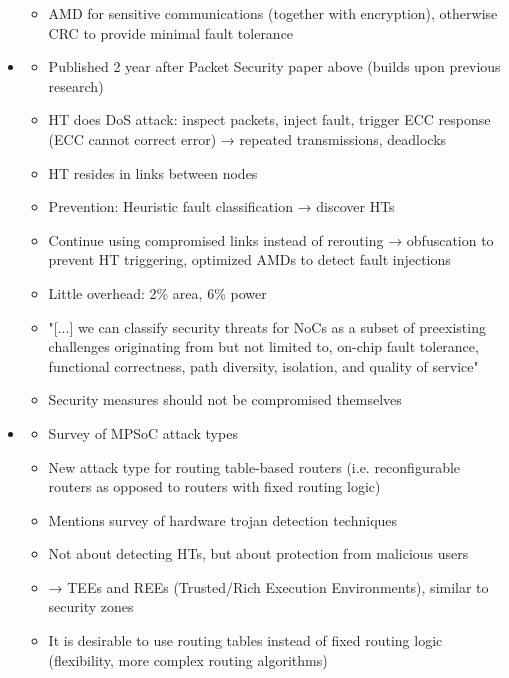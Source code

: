 \begin{itemize}
\begin{itemize}
            \item AMD for sensitive communications (together with encryption), otherwise CRC to provide minimal fault tolerance
        \end{itemize}
    \item \textbf{} \checkmark
        \begin{itemize}
            \item Published 2 year after Packet Security paper above (builds upon previous research)
            \item HT does DoS attack: inspect packets, inject fault, trigger ECC response (ECC cannot correct error) → repeated transmissions,
                deadlocks
            \item HT resides in links between nodes
            \item Prevention: Heuristic fault classification → discover HTs
            \item Continue using compromised links instead of rerouting → obfuscation to prevent HT triggering, optimized AMDs to detect fault
                injections
            \item Little overhead: 2\% area, 6\% power
            \item "[...] we can classify security threats for NoCs as a subset of preexisting challenges originating from but not limited to,
                on-chip fault tolerance, functional correctness, path diversity, isolation, and quality of service"
            \item Security measures should not be compromised themselves
        \end{itemize}
    \item \textbf{}
        \begin{itemize}
            \item Survey of MPSoC attack types
            \item New attack type for routing table-based routers (i.e. reconfigurable routers as opposed to routers with fixed routing logic)
            \item Mentions survey of hardware trojan detection techniques
            \item Not about detecting HTs, but about protection from malicious users
            \item → TEEs and REEs (Trusted/Rich Execution Environments), similar to security zones
            \item It is desirable to use routing tables instead of fixed routing logic (flexibility, more complex routing algorithms)

\end{itemize}
\end{itemize}
